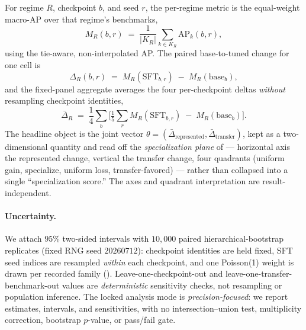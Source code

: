 For regime $R$, checkpoint $b$, and seed $r$, the per-regime metric is the equal-weight macro-AP over
that regime's benchmarks,
\begin{equation}
\label{eq:regime-metric}
M_R(b,r) \;=\; \frac{1}{|K_R|}\sum_{k\in K_R}\mathrm{AP}_k(b,r),
\end{equation}
using the tie-aware, non-interpolated  AP. The paired base-to-tuned change for one
cell is
\begin{equation}
\label{eq:delta}
\Delta_R(b,r) \;=\; M_R(\mathrm{SFT}_{b,r}) \;-\; M_R(\mathrm{base}_b),
\end{equation}
and the fixed-panel aggregate averages the four per-checkpoint deltas \emph{without} resampling
checkpoint identities,
\begin{equation}
\label{eq:agg}
\bar\Delta_R \;=\; \frac{1}{4}\sum_{b}\Big[\tfrac{1}{5}\textstyle\sum_r M_R(\mathrm{SFT}_{b,r})
\;-\; M_R(\mathrm{base}_b)\Big].
\end{equation}
The headline object is the joint vector $\theta=(\bar\Delta_{\text{represented}},
\bar\Delta_{\text{transfer}})$, kept as a two-dimensional quantity and read off the
\emph{specialization plane} of  --- horizontal axis the represented change, vertical the
transfer change, four quadrants (uniform gain, specialize, uniform loss, transfer-favored) --- rather
than collapsed into a single ``specialization score.'' The axes and quadrant interpretation are
result-independent.

\paragraph{Uncertainty.} We attach $95\%$ two-sided intervals with $10{,}000$ paired
hierarchical-bootstrap replicates (fixed RNG seed $20260712$): checkpoint identities are held fixed, SFT
seed indices are resampled \emph{within} each checkpoint, and one Poisson(1) weight is drawn per
recorded family (). Leave-one-checkpoint-out and leave-one-transfer-benchmark-out
values are \emph{deterministic} sensitivity checks, not resampling or population inference. The locked
analysis mode is \emph{precision-focused}: we report estimates, intervals, and sensitivities, with no
intersection--union test, multiplicity correction, bootstrap $p$-value, or pass/fail gate.

